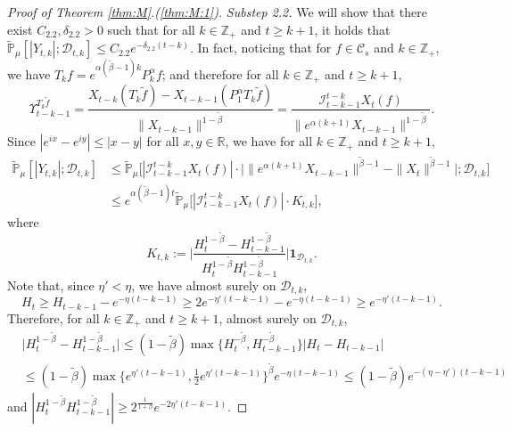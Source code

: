 \documentclass[EJP]{ejpecp} %
\begin{document}
\begin{proof}[Proof of Theorem \ref{thm:M}.(\ref{thm:M:1})]
  	\emph{Substep 2.2.} We will show that there exist $C_{2.2},\delta_{2.2} > 0$ such that for all $k\in \mathbb Z_+$ and $t\geq k+1$, it holds that $ \mathbb{\widetilde{P}}_{\mu} [|Y_{t,k}|;\mathcal{D}_{t,k}] \leq  C_{2.2} e^{-\delta_{2.2} (t-k)}$.
  	In fact, noticing that for $f\in \mathcal C_s$ and $k\in \mathbb Z_+$, we have $T_kf = e^{\alpha (\tilde \beta - 1 )k}P_k^\alpha f $; and therefore for all $k\in \mathbb Z_+$ and $t \geq k + 1$,
\begin{equation}
\label{eq:gammafunction11}
    \Upsilon_{t-k-1}^{T_{k} \tilde f}
    = \frac{X_{t-k}(T_{k} \tilde  f) - X_{t -k-1}(P_1^\alpha T_{k} \tilde f)}{\|X_{t-k-1}\|^{1-\tilde \beta}}
    = \frac{\mathcal I_{t - k - 1}^{t - k} X_t(f)}{\|e^{\alpha (k+1)}X_{t-k-1} \|^{1 -\tilde \beta}}.
\end{equation}
Since $|e^{ix}-e^{iy}|\leq|x-y|$ for all $x,y\in \mathbb R$, we have for all $k \in \mathbb Z_+$ and $t\geq k+1$,
\begin{align}
\label{eq: control of Ykt}
    \mathbb{\widetilde{P}}_{\mu}[|Y_{t,k}|;\mathcal{D}_{t,k}]
    & \leq \mathbb{\widetilde{P}}_{\mu}\Big[|\mathcal I_{t-k-1}^{t-k} X_t(f) | \cdot \Big| \| e^{\alpha(k+1)}X_{t-k-1}\| ^{ \tilde \beta - 1} - \|X_t\|^{ \tilde \beta - 1}\Big|; \mathcal D_{t,k}\Big] \\
    & \leq  e^{\alpha(\tilde \beta - 1)t}\mathbb{\widetilde{P}}_{\mu}\big[|\mathcal I_{t-k-1}^{t-k}X_t(f)|\cdot K_{t,k}\big],
\end{align}
where
\[
    K_{t,k}
    := \Big| \frac {H_t^{1- \tilde \beta} - H_{t-k-1}^{1 - \tilde \beta}} {H_t^{1 - \tilde \beta} H_{t-k-1}^{ 1- \tilde \beta }} \Big| \mathbf{1}_{\mathcal{D}_{t,k}}.
\]
	Note that, since $\eta' < \eta$, we have almost surely on $\mathcal D_{t,k}$,
\[
 	H_t
	\geq H_{t-k-1}- e^{-\eta (t-k-1)}
   	\geq 2e^{-\eta'(t-k-1)}-e^{-\eta(t-k-1)}
   	\geq e^{-\eta'(t-k-1)}.
\]
  	Therefore, for all $k \in \mathbb Z_+$ and $t\geq k+1$, almost surely  on $\mathcal D_{t,k}$,
\begin{align}
    & \Big|H_t^{1- \tilde \beta}-H_{t-k-1}^{1- \tilde \beta}\Big|
   	\leq (1- \tilde \beta) \max \{ H_t^{-\tilde \beta }, H_{t-k-1}^{ -\tilde \beta} \} | H_t - H_{t-k-1} | \\
    & \leq (1- \tilde \beta ) \max\{e^{\eta' (t-k-1)}, \frac{1}{2}e^{\eta'(t-k-1)}\}^{\tilde \beta} e^{-\eta(t-k-1)}  \leq (1- \tilde \beta) e^{-(\eta - \eta') (t-k-1)}
\end{align}
	and $ |H_t^{1 - \tilde \beta} H_{t-k-1}^{ 1 - \tilde \beta}| \geq 2^{\frac{1}{1+\beta}} e^{-2\eta'(t-k-1)}$.

\end{proof}
\end{document}
